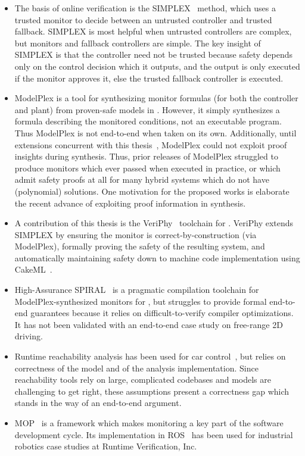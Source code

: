 \documentclass[12pt]{cmuthesis}
\theoremstyle{definition}
\theoremstyle{remark}
\newcommand{\VeriPhy}{VeriPhy\xspace}
\newcommand{\ModelPlex}{ModelPlex\xspace}
\begin{document}
\begin{itemize}
\item The basis of online verification is the SIMPLEX~\cite{Krogh1998TheSA} method, which uses a trusted monitor to decide between an untrusted controller and trusted fallback.
  SIMPLEX is most helpful when untrusted controllers are complex, but monitors and fallback controllers are simple.
  The key insight of SIMPLEX is that the controller need not be trusted because safety depends only on the control decision which it outputs, and the output is only executed if the monitor approves it, else the trusted fallback controller is executed.
\item \ModelPlex is a tool for synthesizing \dL monitor formulas (for both the controller and plant) from proven-safe \dL models in \KeYmaeraX.
  However, it simply synthesizes a \dL formula describing the monitored conditions, not an executable program.
  Thus \ModelPlex is not end-to-end when taken on its own.
  Additionally, until extensions concurrent with this thesis~\cite{DBLP:journals/corr/abs-1811-06502}, \ModelPlex could not exploit proof insights during synthesis.
  Thus, prior releases of \ModelPlex struggled to produce monitors which ever passed when executed in practice, or which admit safety proofs at all for many hybrid systems which do not have (polynomial) solutions.
  One motivation for the proposed works is elaborate the recent advance of exploiting proof information in synthesis.
\item A contribution of this thesis is the \VeriPhy~\cite{DBLP:conf/pldi/BohrerTMMP18} toolchain for \dL.
  \VeriPhy extends SIMPLEX by ensuring the monitor is correct-by-construction (via \ModelPlex), formally proving the safety of the resulting system, and automatically maintaining safety down to machine code implementation using CakeML~\cite{DBLP:conf/popl/KumarMNO14}.
\item High-Assurance SPIRAL~\cite{DBLP:journals/csm/FranchettiLMMGPPKMFJPV17} is a pragmatic compilation toolchain for \ModelPlex-synthesized monitors for \dL, 
  but struggles to provide formal end-to-end guarantees because it relies on difficult-to-verify compiler optimizations.
  It has not been validated with an end-to-end case study on free-range 2D driving.
\item Runtime reachability analysis has been used for car control~\cite{DBLP:journals/trob/AlthoffD14}, but relies on correctness of the model and of the analysis implementation.
Since reachability tools rely on large, complicated codebases and models are challenging to get right, these assumptions present a correctness gap which stands in the way of an end-to-end argument.
\item  MOP~\cite{DBLP:conf/oopsla/ChenR07} is a framework which makes monitoring a key part of the software development cycle.
  Its implementation in ROS~\cite{DBLP:conf/rv/HuangEZMLSR14} has been used for industrial robotics case studies at Runtime Verification, Inc.
\end{itemize}
\end{document}
